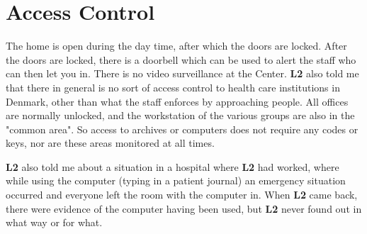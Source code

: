 \documentclass[11pt]{article}
\begin{document}
\section{Access Control}
The home is open during the day time, after which the doors are locked. After the doors are locked, there is a doorbell which can be used to alert the staff who can then let you in. There is no video surveillance at the Center. \textbf{L2} also told me that there in general is no sort of access control to health care institutions in Denmark, other than what the staff enforces by approaching people. All offices are normally unlocked, and the workstation of the various groups are also in the "common area". So access to archives or computers does not require any codes or keys, nor are these areas monitored at all times.

\textbf{L2} also told me about a situation in a hospital where \textbf{L2} had worked, where while using the computer (typing in a patient journal) an emergency situation occurred and everyone left the room with the computer in. When \textbf{L2} came back, there were evidence of the computer having been used, but \textbf{L2} never found out in what way or for what.
\end{document}
